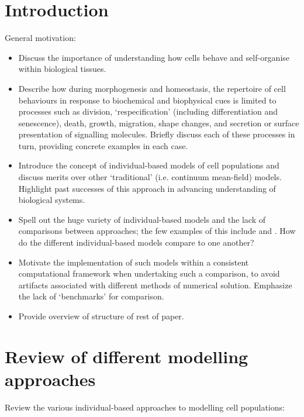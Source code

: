 \documentclass[12pt]{article}
\begin{document}
\section{Introduction} \label{sec:intro}

General motivation:
\begin{itemize}
\item Discuss the importance of understanding how cells behave and self-organise within biological tissues.
\item Describe how during morphogenesis and homeostasis, the repertoire of cell behaviours in response to biochemical and biophysical cues is limited to processes such as division, `respecification' (including differentiation and senescence), death, growth, migration, shape changes, and secretion or surface presentation of signalling molecules. Briefly discuss each of these processes in turn, providing concrete examples in each case.
\item Introduce the concept of individual-based models of cell populations and discuss merits over other `traditional' (i.e. continuum mean-field) models. Highlight past successes of this approach in advancing understanding of biological systems.
\item Spell out the huge variety of individual-based models and the lack of comparisons between approaches; the few examples of this include \citet{Galle2006Individual} and \citet{Osborne2010Hybrid}. How do the different individual-based models compare to one another?
\item Motivate the implementation of such models within a consistent computational framework when undertaking such a comparison, to avoid artifacts associated with different methods of numerical solution. Emphasize the lack of `benchmarks' for comparison.
\item Provide overview of structure of rest of paper.
\end{itemize}


\section{Review of different modelling approaches}\label{sec:discrete_models}

Review the various individual-based approaches to modelling cell populations:
\end{document}

